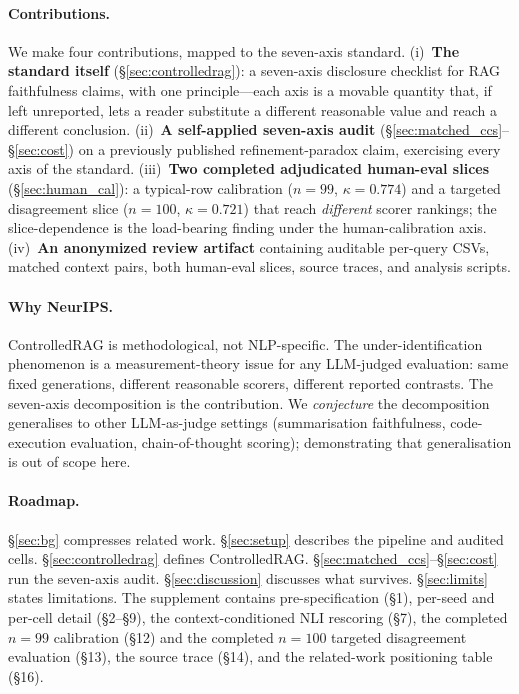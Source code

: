 \paragraph{Contributions.} We make four contributions, mapped to
the seven-axis standard.
(i)~\textbf{The standard itself} (\S\ref{sec:controlledrag}): a
seven-axis disclosure checklist for RAG faithfulness claims, with
one principle---each axis is a movable quantity that, if left
unreported, lets a reader substitute a different reasonable value
and reach a different conclusion.
(ii)~\textbf{A self-applied seven-axis audit}
(\S\ref{sec:matched_ccs}--\S\ref{sec:cost}) on a previously
published refinement-paradox claim, exercising every axis of the
standard.
(iii)~\textbf{Two completed adjudicated human-eval slices}
(\S\ref{sec:human_cal}): a typical-row calibration
($n{=}99$, $\kappa{=}0.774$) and a targeted disagreement slice
($n{=}100$, $\kappa{=}0.721$) that reach \emph{different} scorer
rankings; the slice-dependence is the load-bearing finding under
the human-calibration axis.
(iv)~\textbf{An anonymized review artifact} containing auditable
per-query CSVs, matched context pairs, both human-eval slices,
source traces, and analysis scripts.

\paragraph{Why NeurIPS.} ControlledRAG is methodological, not
NLP-specific. The under-identification phenomenon is a
measurement-theory issue for any LLM-judged evaluation: same fixed
generations, different reasonable scorers, different reported
contrasts. The seven-axis decomposition is the contribution. We
\emph{conjecture} the decomposition generalises to other
LLM-as-judge settings (summarisation faithfulness, code-execution
evaluation, chain-of-thought scoring); demonstrating that
generalisation is out of scope here.

\paragraph{Roadmap.} \S\ref{sec:bg} compresses related work.
\S\ref{sec:setup} describes the pipeline and audited cells.
\S\ref{sec:controlledrag} defines ControlledRAG.
\S\ref{sec:matched_ccs}--\S\ref{sec:cost} run the seven-axis audit.
\S\ref{sec:discussion} discusses what survives. \S\ref{sec:limits}
states limitations. The supplement contains pre-specification
(\S 1), per-seed and per-cell detail (\S 2--\S 9), the
context-conditioned NLI rescoring (\S 7), the completed
$n=99$ calibration (\S 12) and the completed $n=100$ targeted
disagreement evaluation (\S 13), the source trace (\S 14), and the
related-work positioning table (\S 16).

